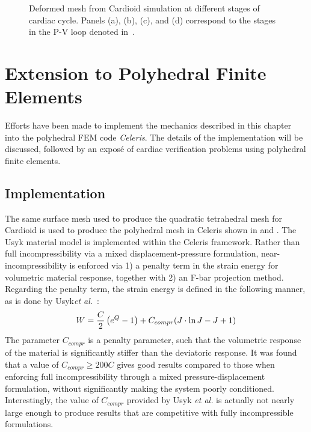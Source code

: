\begin{figure}[ht!]
{\label{fig:snaps4}}		
%
\caption{Deformed mesh from Cardioid simulation at different stages of cardiac cycle. Panels (a), (b), (c), and (d) correspond to the stages in the P-V loop denoted in~.}
\label{fig:snaps}
\end{figure}

\section{Extension to Polyhedral Finite Elements}
\label{Polyhedral Finite Elements}

Efforts have been made to implement the mechanics described in this chapter into the polyhedral FEM code \textit{Celeris}. The details of the implementation will be discussed, followed by an expos\'{e} of cardiac verification problems using polyhedral finite elements.

\subsection{Implementation}

The same surface mesh used to produce the quadratic tetrahedral mesh for Cardioid is used to produce the polyhedral mesh in Celeris shown in  and . The Usyk material model is implemented within the Celeris framework. Rather than full incompressibility via a mixed displacement-pressure formulation, near-incompressibility is enforced via 1) a penalty term in the strain energy for volumetric material response, together with 2) an F-bar projection method. Regarding the penalty term, the strain energy is defined in the following manner, as is done by Usyk\textit{et al.}~\cite{usyk_2002}:
\begin{equation}
W = \frac{C}{2}\left(e^Q -1\right) + C_{compr} (J \cdot \ln J - J + 1) \\
\end{equation}
The parameter $C_{compr}$ is a penalty parameter, such that the volumetric response of the material is significantly stiffer than the deviatoric response. It was found that a value of $C_{compr} \geq 200  C$ gives good results compared to those when enforcing full incompressibility through a mixed pressure-displacement formulation, without significantly making the system poorly conditioned. Interestingly, the value of $C_{compr}$ provided by Usyk \textit{et al.} is actually not nearly large enough to produce results that are competitive with fully incompressible formulations.

